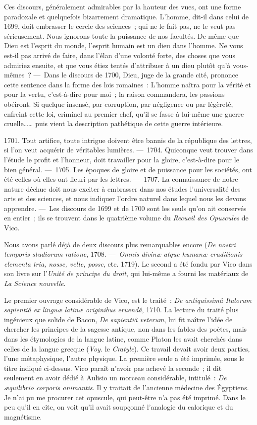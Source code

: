 \documentclass[french,twoside]{book} %
\begin{document}
Ces discours, généralement admirables par la hauteur des vues, ont une forme paradoxale et quelquefois bizarrement dramatique. L’homme, dit-il dans celui de 1699, doit embrasser le cercle des sciences ; qui ne le fait pas, ne le veut pas sérieusement. Nous ignorons toute la puissance de nos facultés. De même que Dieu est l’esprit du monde, l’esprit humain est un dieu dans l’homme. Ne vous est-il pas arrivé de faire, dans l’élan d’une volonté forte, des choses que vous admiriez ensuite, et que vous étiez tentés d’attribuer à un dieu plutôt qu’à vous-mêmes ? — Dans le discours de 1700, Dieu, juge de la grande cité, prononce cette sentence dans la forme des lois romaines : L’homme naîtra pour la vérité et pour la vertu, c’est-à-dire pour moi ; la raison commandera, les passions obéiront. Si quelque insensé, par corruption, par négligence ou par légèreté, enfreint cette loi, criminel au premier chef, qu’il se fasse à lui-même une guerre cruelle…… puis vient la description pathétique de cette guerre intérieure.\par
1701. Tout artifice, toute intrigue doivent être bannis de la république des lettres, si l’on veut acquérir de véritables lumières. — 1704. Quiconque veut trouver dans l’étude le profit et l’honneur, doit travailler pour la gloire, c’est-à-dire pour le bien général. — 1705. Les époques de gloire et de puissance pour les sociétés, ont été celles où elles ont fleuri par les lettres. — 1707. La connaissance de notre nature déchue doit nous exciter à embrasser dans nos études l’universalité des arts et des sciences, et nous indiquer l’ordre naturel dans lequel nous les devons apprendre. — Les discours de 1699 et de 1700 sont les seuls qu’on ait conservés en entier ; ils se trouvent dans le quatrième volume du {\itshape Recueil des Opuscules} de Vico.\par
 Nous avons parlé déjà de deux discours plus remarquables encore ({\itshape De nostri temporis studiorum ratione}, 1708. — {\itshape Omnis divinæ atque humanæ eruditionis elementa tria, nosse, velle, posse}, etc. 1719). Le second a été fondu par Vico dans son livre sur l’{\itshape Unité de principe du droit}, qui lui-même a fourni les matériaux de {\itshape La Science nouvelle}.\par
Le premier ouvrage considérable de Vico, est le traité : {\itshape De antiquissimâ Italorum sapientiâ ex linguæ latinæ originibus eruendâ}, 1710. La lecture du traité plus ingénieux que solide de Bacon, {\itshape De sapientiâ veterum}, lui fit naître l’idée de chercher les principes de la sagesse antique, non dans les fables des poètes, mais dans les étymologies de la langue latine, comme Platon les avait cherchés dans celles de la langue grecque ({\itshape Voy.} le {\itshape Cratyle}). Ce travail devait avoir deux parties, l’une métaphysique, l’autre physique. La première seule a été imprimée, sous le titre indiqué ci-dessus. Vico paraît n’avoir pas achevé la seconde ; il dit seulement en avoir dédié à Aulisio un morceau considérable, intitulé : {\itshape De æquilibrio corporis animantis}. Il y traitait de l’ancienne médecine des Égyptiens. Je n’ai pu me procurer cet opuscule, qui peut-être n’a pas été imprimé. Dans le peu qu’il en cite, on voit qu’il avait soupçonné l’analogie du calorique et du magnétisme.\par
\end{document}
